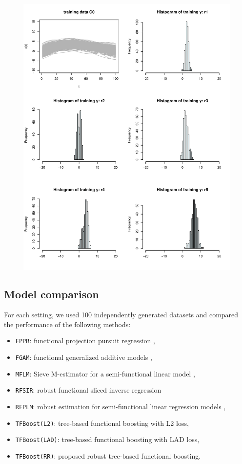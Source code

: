 \documentclass{article}
\begin{document}
\begin{figure}[H]
    \centering
    \includegraphics[scale = 0.7, page = 5]{visualize_outliers.pdf}
\end{figure}



\subsection{Model comparison}
For each setting, we used 100 independently generated datasets and compared the performance of the following methods: 

\begin{itemize}
 \setlength\itemsep{0.1em}
\item \texttt{FPPR}: functional projection pursuit regression \citep{ferraty2013functional},
\item \texttt{FGAM}: functional generalized additive models \citep{mclean2014functional}, 
\item \texttt{MFLM}: Sieve M-estimator for a semi-functional linear model \citep{huang2015sieve},
\item \texttt{RFSIR}: robust functional sliced inverse regression \citep{wang2017robust}
\item \texttt{RFPLM}: robust estimation for semi-functional linear regression models \citep{boente2020robust},
\item  \texttt{TFBoost(L2)}:  tree-based functional boosting with L2 loss,
\item  \texttt{TFBoost(LAD)}:  tree-based functional boosting with LAD loss,
\item  \texttt{TFBoost(RR)}:  proposed robust  tree-based functional boosting. 
\end{itemize}
\end{document}
